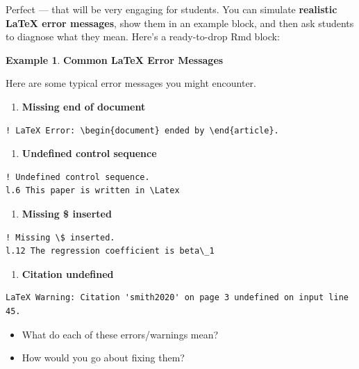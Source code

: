 \documentclass[
]{book}
\providecommand{\tightlist}{%
  \setlength{\itemsep}{0pt}\setlength{\parskip}{0pt}}
\theoremstyle{definition}
\theoremstyle{definition}
\newtheorem{example}{Example}[chapter]
\theoremstyle{definition}
\theoremstyle{definition}
\theoremstyle{remark}
\begin{document}
Perfect --- that will be very engaging for students. You can simulate \textbf{realistic LaTeX error messages}, show them in an example block, and then ask students to diagnose what they mean. Here's a ready-to-drop Rmd block:

\begin{example}

\textbf{Common LaTeX Error Messages}

Here are some typical error messages you might encounter.

\begin{enumerate}
\def\labelenumi{\arabic{enumi}.}
\tightlist
\item
  \textbf{Missing end of document}
\end{enumerate}

\begin{verbatim}
! LaTeX Error: \begin{document} ended by \end{article}.
\end{verbatim}

\begin{enumerate}
\def\labelenumi{\arabic{enumi}.}
\setcounter{enumi}{1}
\tightlist
\item
  \textbf{Undefined control sequence}
\end{enumerate}

\begin{verbatim}
! Undefined control sequence.
l.6 This paper is written in \Latex
\end{verbatim}

\begin{enumerate}
\def\labelenumi{\arabic{enumi}.}
\setcounter{enumi}{2}
\tightlist
\item
  \textbf{Missing \$ inserted}
\end{enumerate}

\begin{verbatim}
! Missing \$ inserted.
l.12 The regression coefficient is beta\_1
\end{verbatim}

\begin{enumerate}
\def\labelenumi{\arabic{enumi}.}
\setcounter{enumi}{3}
\tightlist
\item
  \textbf{Citation undefined}
\end{enumerate}

\begin{verbatim}
LaTeX Warning: Citation 'smith2020' on page 3 undefined on input line 45.
\end{verbatim}

\begin{itemize}
\tightlist
\item
  What do each of these errors/warnings mean?\\
\item
  How would you go about fixing them?\\
\end{itemize}

\end{example}
\end{document}
